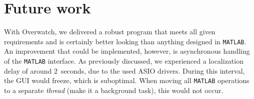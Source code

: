 \documentclass[11pt,titlepage]{report}
\begin{document}
\section{Future work}
With Overwatch, we delivered a robust program that meets all given requirements and is certainly better looking than anything designed in \texttt{MATLAB}. An improvement that could be implemented, however, is asynchronous handling of the \texttt{MATLAB} interface. As previously discussed, we experienced a localization delay of around \SI{2}{seconds}, due to the used ASIO drivers. During this interval, the GUI would freeze, which is suboptimal. When moving all \texttt{MATLAB} operations to a separate \emph{thread} (make it a background task), this would not occur.
\end{document}
